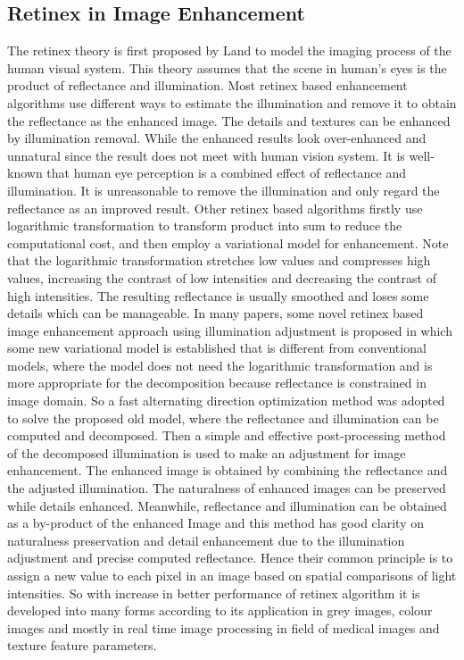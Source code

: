\subsection{Retinex in Image Enhancement}
The retinex theory is first proposed by Land to model the imaging process of the human visual system. This theory assumes that the scene in human’s eyes is the product of reflectance and illumination. Most retinex based enhancement algorithms use different ways to estimate the illumination and remove it to obtain the reflectance as the enhanced image. The details and textures can be enhanced by illumination removal. While the enhanced results look over-enhanced and unnatural since the result does not meet with human vision system. It is well-known that human eye perception is a combined effect of reflectance and illumination. It is unreasonable to remove the illumination and only regard the reflectance as an improved result. Other retinex based algorithms firstly use logarithmic transformation to transform product into sum to reduce the computational cost, and then employ a variational model for enhancement. Note that the logarithmic transformation stretches low values and compresses high values, increasing the contrast of low intensities and decreasing the contrast of high intensities. The resulting reflectance is usually smoothed and loses some details which can be manageable. In many papers, some novel retinex based image enhancement approach using illumination adjustment is proposed in which some new variational model is established that is different from conventional models, where the model does not need the logarithmic transformation and is more appropriate for the decomposition because reflectance is constrained in image domain. So a fast alternating direction optimization method was adopted to solve the proposed old model, where the reflectance and illumination can be computed and decomposed. Then a simple and effective post-processing method of the decomposed illumination is used to make an adjustment for image enhancement. The enhanced image is obtained by combining the reflectance and the adjusted illumination. The naturalness of enhanced images can be preserved while details enhanced. Meanwhile, reflectance and illumination can be obtained as a by-product of the enhanced Image and this method has good clarity on naturalness preservation and detail enhancement due to the illumination adjustment and precise computed reflectance. Hence their common principle is to assign a new value to each pixel in an image based on spatial comparisons of light intensities. So with increase in better performance of retinex algorithm it is developed into many forms according to its application in grey images, colour images and mostly in real time image processing in field of medical images and texture feature parameters.

